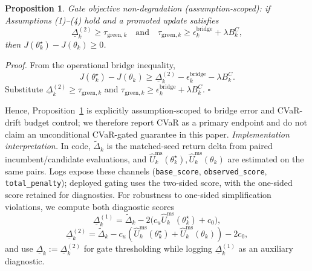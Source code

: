 \documentclass[letterpaper,10pt,conference]{ieeeconf}
\newtheorem{proposition}{Proposition}
\begin{document}
\begin{proposition}
\label{prop:objective-nondegradation}
Gate objective non-degradation (assumption-scoped): if Assumptions (1)--(4) hold and a promoted update satisfies
\[
\underline{\Delta}_k^{(2)} \ge \tau_{\text{green},k}
\quad\text{and}\quad
\tau_{\text{green},k}\ge \epsilon_k^{\mathrm{bridge}}+\lambda B_k^C,
\]
then \(J(\theta_k^\star)-J(\theta_k)\ge 0\).
\end{proposition}
\noindent\textit{Proof.}
From the operational bridge inequality,
\[
J(\theta_k^\star)-J(\theta_k)\ge \underline{\Delta}_k^{(2)}-\epsilon_k^{\mathrm{bridge}}-\lambda B_k^C.
\]
Substitute \(\underline{\Delta}_k^{(2)}\ge\tau_{\text{green},k}\) and \(\tau_{\text{green},k}\ge\epsilon_k^{\mathrm{bridge}}+\lambda B_k^C\).
\hfill$\square$

Hence, Proposition~\ref{prop:objective-nondegradation} is explicitly assumption-scoped to bridge error and CVaR-drift budget control; we therefore report CVaR as a primary endpoint and do not claim an unconditional CVaR-gated guarantee in this paper.
\textit{Implementation interpretation.}
In code, $\tilde{\Delta}_k$ is the matched-seed return delta from paired incumbent/candidate evaluations, and $\widehat{U}^{\mathrm{ms}}_k(\theta_k^\star),\widehat{U}^{\mathrm{ms}}_k(\theta_k)$ are estimated on the same pairs. Logs expose these channels (\texttt{base\_score}, \texttt{observed\_score}, \texttt{total\_penalty}); deployed gating uses the two-sided score, with the one-sided score retained for diagnostics.
For robustness to one-sided simplification violations, we compute both diagnostic scores
\[
\underline{\Delta}_k^{(1)}=\tilde{\Delta}_k - 2\big(c_u \widehat{U}^{\mathrm{ms}}_k(\theta_k^\star) + c_0\big),
\]
\begin{equation}
\underline{\Delta}_k^{(2)}=\tilde{\Delta}_k - c_u\!\left(\widehat{U}^{\mathrm{ms}}_k(\theta_k^\star)+\widehat{U}^{\mathrm{ms}}_k(\theta_k)\right)-2c_0,
\label{eq:two-sided-proxy-def}
\end{equation}
and use $\underline{\Delta}_k:=\underline{\Delta}_k^{(2)}$ for gate thresholding while logging $\underline{\Delta}_k^{(1)}$ as an auxiliary diagnostic.
\end{document}

